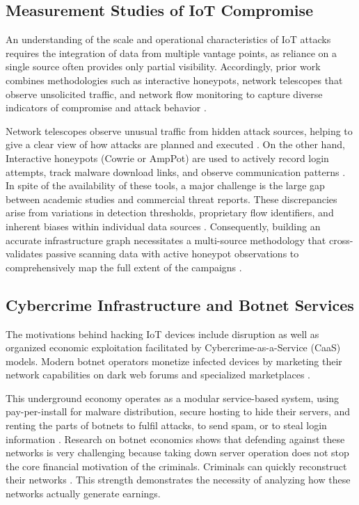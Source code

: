 \documentclass[journal]{IEEEtran}
\begin{document}
\subsection{Measurement Studies of IoT Compromise}

An understanding of the scale and operational characteristics of IoT attacks requires the integration of data from multiple vantage points, as reliance on a single source often provides only partial visibility. Accordingly, prior work combines methodologies such as interactive honeypots, network telescopes that observe unsolicited traffic, and network flow monitoring to capture diverse indicators of compromise and attack behavior \cite{hiesgen2024age}.

Network telescopes observe unusual traffic from hidden attack sources, helping to give a clear view of how attacks are planned and executed \cite{hiesgen2024age}. On the other hand, Interactive honeypots (Cowrie or AmpPot) are used to actively record login attempts, track malware download links, and observe communication patterns \cite{garg2025iot, hiesgen2024age}. In spite of the availability of these tools, a major challenge is the large gap between academic studies and commercial threat reports. These discrepancies arise from variations in detection thresholds, proprietary flow identifiers, and inherent biases within individual data sources \cite{hiesgen2024age}. Consequently, building an accurate infrastructure graph necessitates a multi-source methodology that cross-validates passive scanning data with active honeypot observations to comprehensively map the full extent of the campaigns \cite{asiri2023understanding}.

\subsection{Cybercrime Infrastructure and Botnet Services}

The motivations behind hacking IoT devices include disruption as well as organized economic exploitation facilitated by Cybercrime-as-a-Service (CaaS) models. Modern botnet operators monetize infected devices by marketing their network capabilities on dark web forums and specialized marketplaces \cite{georgoulias2023botnet}.

This underground economy operates as a modular service-based system, using pay-per-install for malware distribution, secure hosting to hide their servers, and renting the parts of botnets to fulfil attacks, to send spam, or to steal login information \cite{georgoulias2023botnet}. Research on botnet economics shows that defending against these networks is very challenging because taking down server operation does not stop the core financial motivation of the criminals. Criminals can quickly reconstruct their networks \cite{georgoulias2023botnet}. This strength demonstrates the necessity of analyzing how these networks actually generate earnings.
\end{document}
